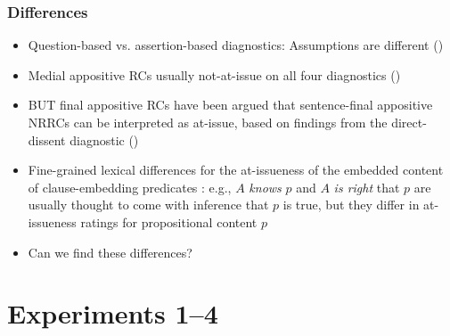 \documentclass[compress, xcolor = dvipsnames, aspectratio=169]{beamer}
\begin{document}
	\begin{frame}[t]\frametitle{Differences}\scriptsize
	
		\begin{itemize}
			\item Question-based vs. assertion-based diagnostics: Assumptions are different (\citealt{snider_anaphoric_2017,snider_at-issuenessne_2017,snider_distinguishing_2018,koev_notions_2018,faller_discourse_2019,korotkova_evidential_2020})
			\item Medial appositive RCs usually not-at-issue on all four diagnostics (\citealt{potts_logic_2005,amaral_review_2007,tonhauser_diagnosing_2012,syrett_experimental_2015,destruel_cross-linguistic_2015,tonhauser_how_2018,solstad_cataphoric_2024})

			\item BUT final appositive RCs have been argued that sentence-final appositive NRRCs can be interpreted as at-issue, based on findings from the direct-dissent diagnostic (\citealt{syrett_experimental_2015,anderbois_at-issue_2015})

			
			\item Fine-grained lexical differences for the at-issueness of the embedded content of clause-embedding predicates \citealt{tonhauser_how_2018,degen-tonhauser-glossa}: e.g., $A$ \emph{knows} $p$ and $A$ \emph{is right} that $p$ are usually thought to come with inference that $p$ is true, but they differ in at-issueness ratings for propositional content $p$


			\item Can we find these differences?
		\end{itemize}
	
	\end{frame}

\section{Experiments 1--4}
\end{document}
